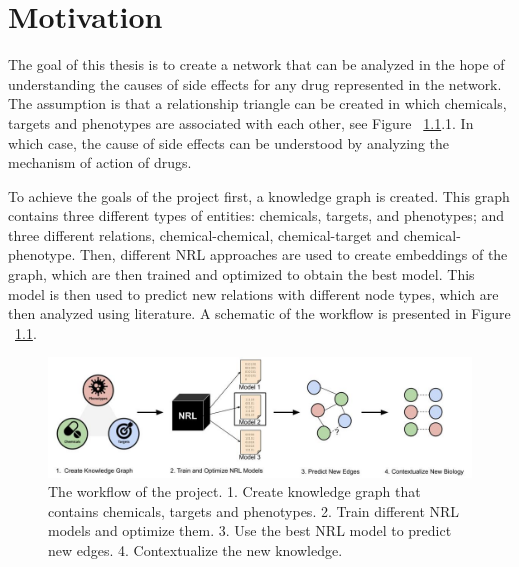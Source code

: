 \chapter{Motivation}
\label{motivation}

The goal of this thesis is to create a network that can be analyzed in the hope of understanding the causes of side effects for any drug represented in the network. The assumption is that a relationship triangle can be created in which chemicals, targets and phenotypes are associated with each other, see Figure ~\ref{fig:workflow}.1. In which case, the cause of side effects can be understood by analyzing the mechanism of action of drugs.

To achieve the goals of the project first, a knowledge graph is created. This graph contains three different types of entities: chemicals, targets, and phenotypes; and three different relations, chemical-chemical, chemical-target and chemical-phenotype. Then, different \ac{NRL} approaches are used to create embeddings of the graph, which are then trained and optimized to obtain the best model. This model is then used to predict new relations with different node types, which are then analyzed using literature. A schematic of the workflow is presented in Figure ~\ref{fig:workflow}.

\begin{figure}[!ht]
    \centering
    \includegraphics[scale=0.35]
    {figures/workflow.jpg}
    \caption [The workflow of the project]{\label{fig:workflow} The workflow of the project. 1. Create knowledge graph that contains chemicals, targets and phenotypes. 2. Train different NRL models and optimize them. 3. Use the best NRL model to predict new edges. 4. Contextualize the new knowledge.}
\end{figure}